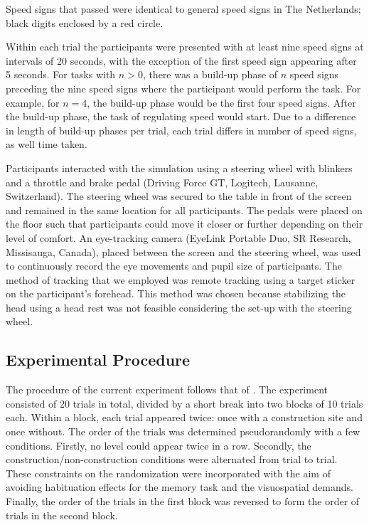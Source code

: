 Speed signs that passed were identical to general speed signs in The Netherlands; black digits enclosed by a red circle. 

Within each trial the participants were presented with at least nine speed signs at intervals of 20 seconds, with the exception of the first speed sign appearing after 5 seconds. 
For \nback tasks with \(n > 0\), there was a build-up phase of \(n\) speed signs preceding the nine speed signs where the participant would perform the task. 
For example, for \(n = 4\), the build-up phase would be the first four speed signs. 
After the build-up phase, the task of regulating speed would start. 
Due to a difference in length of build-up phases per \nback trial, each trial differs in number of speed signs, as well time taken.

Participants interacted with the simulation using a steering wheel with blinkers and a throttle and brake pedal (Driving Force GT, Logitech, Lausanne, Switzerland). 
The steering wheel was secured to the table in front of the screen and remained in the same location for all participants. 
The pedals were placed on the floor such that participants could move it closer or further depending on their level of comfort. 
An eye-tracking camera (EyeLink Portable Duo, SR Research, Missisauga, Canada), placed between the screen and the steering wheel, was used to continuously record the eye movements and pupil size of participants. 
The method of tracking that we employed was remote tracking using a target sticker on the participant's forehead.
This method was chosen because stabilizing the head using a head rest was not feasible considering the set-up with the steering wheel.

\subsection{Experimental Procedure}
The procedure of the current experiment follows that of \citet{Scheunemann2019}.
The experiment consisted of 20 trials in total, divided by a short break into two blocks of 10 trials each. 
Within a block, each \nback trial appeared twice: once with a construction site and once without. 
The order of the trials was determined pseudorandomly with a few conditions. 
Firstly, no \nback level could appear twice in a row. 
Secondly, the construction/non-construction conditions were alternated from trial to trial. 
These constraints on the randomization were incorporated with the aim of avoiding habituation effects for the memory task and the visuospatial demands. 
Finally, the order of the trials in the first block was reversed to form the order of trials in the second block.

